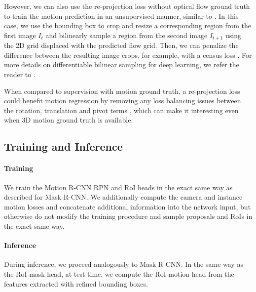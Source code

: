 However, we can also use the re-projection loss without optical flow ground truth
to train the motion prediction in an unsupervised manner, similar to \cite{SfmNet}.
In this case, we use the bounding box to crop and resize a corresponding region
from the first image $I_t$ and bilinearly sample a region from the second image $I_{t+1}$
using the 2D grid displaced with the predicted flow grid. Then, we can penalize the difference
between the resulting image crops, for example, with a census loss \cite{CensusTerm,UnFlow}.
For more details on differentiable bilinear sampling for deep learning, we refer the reader to
\cite{STN}.

When compared to supervision with motion ground truth, a re-projection
loss could benefit motion regression by removing any loss balancing issues between the
rotation, translation and pivot terms \cite{PoseNet2},
which can make it interesting even when 3D motion ground truth is available.

\subsection{Training and Inference}
\label{ssec:training_inference}
\paragraph{Training}
We train the Motion R-CNN RPN and RoI heads in the exact same way as described for Mask R-CNN.
We additionally compute the camera and instance motion losses and concatenate additional
information into the network input, but otherwise do not modify the training procedure
and sample proposals and RoIs in the exact same way.

\paragraph{Inference}
During inference, we proceed analogously to Mask R-CNN.
In the same way as the RoI mask head, at test time, we compute the RoI motion head
from the features extracted with refined bounding boxes.

